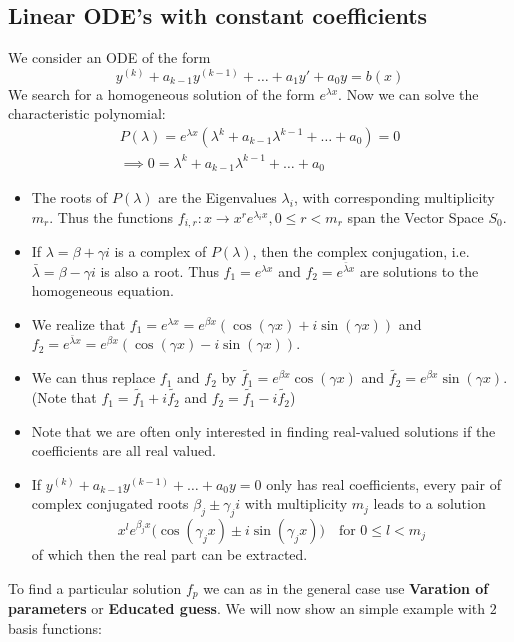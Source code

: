 \documentclass[a4paper,fontsize = 10pt]{article}
\begin{document}
\subsection{Linear ODE's with constant coefficients}
We consider an ODE of the form
\[y^{(k)} + a_{k-1} y^{(k-1)} + \ldots + a_1 y' + a_0 y = b(x)\]
We search for a homogeneous solution of the form \(e^{\lambda x}\). Now we can solve the characteristic polynomial:
\begin{align*}
  P(\lambda) = e^{\lambda x} \left(\lambda^k + a_{k-1}\lambda^{k-1} + \ldots + a_0\right) = 0 \\ 
  \implies 0 = \lambda^k + a_{k-1}\lambda^{k-1} + \ldots+ a_0
\end{align*}
\begin{itemize}
    \item The roots of \(P(\lambda)\) are the Eigenvalues \(\lambda_i\), with corresponding multiplicity \(m_r\). Thus the functions \(f_{i,r} : x \to x^r e^{\lambda_i x}, 0 \leq r < m_r\) span the Vector Space \(S_0\).
    \item If \(\lambda = \beta + \gamma i\) is a complex of \(P(\lambda)\), then the complex conjugation, i.e. \(\bar{\lambda} = \beta - \gamma i\) is also a root. Thus \(f_1 = e^{\lambda x}\) and \(f_2 = e^{\bar{\lambda} x}\) are solutions to the homogeneous equation.
    \item We realize that \(f_1 = e^{\lambda x} = e^{\beta x} (\cos(\gamma x)+ i \sin(\gamma x))\) and \(f_2 = e^{\bar{\lambda} x}= e^{\beta x} (\cos(\gamma x) - i \sin(\gamma x))\).
    \item We can thus replace $f_1$ and $f_2$ by \(\tilde{f_1} = e^{\beta x} \cos(\gamma x)\) and \(\tilde{f_2} = e^{\beta x} \sin(\gamma x)\). (Note that $f_1 = \tilde{f_1} + i \tilde{f_2}$ and $f_2 = \tilde{f_1} - i \tilde{f_2}$)
    \item Note that we are often only interested in finding real-valued solutions if the coefficients are all real valued.
    \item If \(y^{(k)} + a_{k-1}y^{(k-1)} + \dots + a_0 y = 0\) only has real coefficients, every pair of complex conjugated roots $\beta_j \pm \gamma_j i$ with multiplicity $m_j$ leads to a solution \[x^l e^{\beta_j x} \Big( \cos(\gamma_j x) \pm i \sin(\gamma_j x) \Big) \quad \text{for }0 \leq l < m_j\]
    of which then the real part can be extracted.
\end{itemize}
To find a particular solution $f_p$ we can as in the general case use \textbf{Varation of parameters} or \textbf{Educated guess}. We will now show an simple example with $2$ basis functions:
\end{document}
